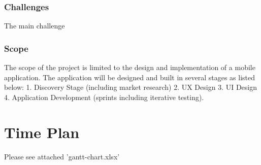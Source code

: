\documentclass[12pt]{article}
\begin{document}
\subsubsection{Challenges}
The main challenge 

\subsubsection{Scope}
The scope of the project is limited to the design and implementation of a mobile application. The application will be designed and built in several stages as listed below:
1. Discovery Stage (including market research)
2. UX Design
3. UI Design
4. Application Development (sprints including iterative testing).


\section{Time Plan}
Please see attached 'gantt-chart.xlsx'
\end{document}
